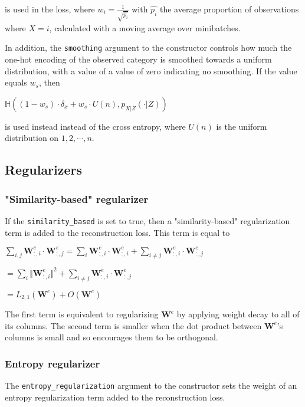 \documentclass[11pt]{article}
\begin{document}
is used in the loss, where
 \(w_i=\frac{1}{\sqrt{\hat{p_i}}}\)
with \(\hat{p_i}\) the average proportion of observations where \(X=i\), calculated with a moving average over minibatches.

In addition, the \texttt{smoothing} argument to the constructor controls how much the one-hot encoding of the observed category is smoothed towards a uniform distribution, with a value of a value of zero indicating no smoothing. If the value equals \(w_s\), then  

\(\mathbb{H}((1-w_s)\cdot\delta_x + w_s\cdot U(n), p_{X|Z}(\cdot|Z))\)

is used instead instead of the cross entropy, where \(U(n)\) is the uniform distribution on \(1, 2, \cdots, n\).
\subsection{Regularizers}
\label{sec:orgb4a174b}
\subsubsection{"Similarity-based" regularizer}
\label{sec:org1b8ac56}

If the \texttt{similarity\_based} is set to true, then a "similarity-based" regularization term is added to the reconstruction loss. This term is equal to

\(\displaystyle\sum_{i, j}\mathbf{W}^e_{:,i}\cdot \mathbf{W}^e_{:, j}=\sum_{i}\mathbf{W}^e_{:,i}\cdot \mathbf{W}^e_{:, i} + \sum_{i\neq j}\mathbf{W}^e_{:,i}\cdot \mathbf{W}^e_{:, j}\)

\(= \displaystyle\sum_{i}\Vert\mathbf{W}^e_{:,i}\Vert^2 + \sum_{i\neq j}\mathbf{W}^e_{:,i}\cdot \mathbf{W}^e_{:, j}\)

\(= L_{2, 1}(\mathbf{W}^e) + O(\mathbf{W}^e)\)

The first term is equivalent to regularizing \(\mathbf{W}^e\) by applying weight decay to all of its columns. The second term is smaller when the dot product between \(\mathbf{W}^e\)'s columns is small and so encourages them to be orthogonal.

\subsubsection{Entropy regularizer}
\label{sec:org500e064}

The \texttt{entropy\_regularization} argument to the constructor sets the weight of an entropy regularization term added to the reconstruction loss.
\end{document}
